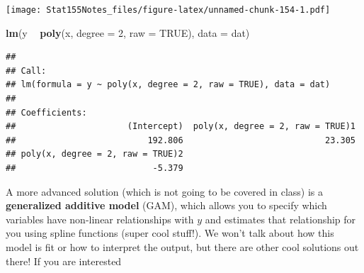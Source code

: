 \documentclass[]{book}
\newenvironment{Shaded}{\begin{snugshade}}{\end{snugshade}}
\newcommand{\DataTypeTok}[1]{\textcolor[rgb]{0.13,0.29,0.53}{#1}}
\newcommand{\DecValTok}[1]{\textcolor[rgb]{0.00,0.00,0.81}{#1}}
\newcommand{\KeywordTok}[1]{\textcolor[rgb]{0.13,0.29,0.53}{\textbf{#1}}}
\newcommand{\NormalTok}[1]{#1}
\newcommand{\OperatorTok}[1]{\textcolor[rgb]{0.81,0.36,0.00}{\textbf{#1}}}
\newcommand{\OtherTok}[1]{\textcolor[rgb]{0.56,0.35,0.01}{#1}}
\newcommand{\StringTok}[1]{\textcolor[rgb]{0.31,0.60,0.02}{#1}}
\begin{document}
\begin{Shaded}
\end{Shaded}

\texttt{[image: Stat155Notes\_files/figure-latex/unnamed-chunk-154-1.pdf]}

\begin{Shaded}
\begin{Highlighting}[]
\KeywordTok{lm}\NormalTok{(y }\OperatorTok{~}\StringTok{ }\KeywordTok{poly}\NormalTok{(x, }\DataTypeTok{degree =} \DecValTok{2}\NormalTok{, }\DataTypeTok{raw =} \OtherTok{TRUE}\NormalTok{), }\DataTypeTok{data =}\NormalTok{ dat)}
\end{Highlighting}
\end{Shaded}

\begin{verbatim}
## 
## Call:
## lm(formula = y ~ poly(x, degree = 2, raw = TRUE), data = dat)
## 
## Coefficients:
##                      (Intercept)  poly(x, degree = 2, raw = TRUE)1  
##                          192.806                            23.305  
## poly(x, degree = 2, raw = TRUE)2  
##                           -5.379
\end{verbatim}

A more advanced solution (which is not going to be covered in class) is a \textbf{generalized additive model} (GAM), which allows you to specify which variables have non-linear relationships with \(y\) and estimates that relationship for you using spline functions (super cool stuff!). We won't talk about how this model is fit or how to interpret the output, but there are other cool solutions out there! If you are interested
\end{document}
